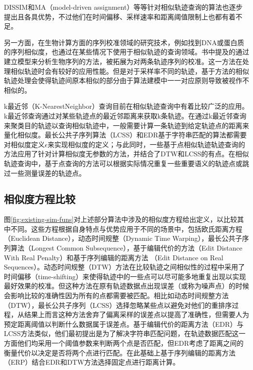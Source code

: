 DISSIM\cite{frentzos2007index}和MA（model-driven assignment）\cite{sankararaman2013model}等等针对相似轨迹查询的算法也逐步提出且各具优势，不过他们在时间偏移、采样速率和距离阈值限制上也都有着不足。

另一方面，在生物计算方面的序列校准领域的研究技术，例如找到DNA或蛋白质的序列相似度，也通过在某些情况下使用于相似轨迹的查询领域。书\cite{durbin1998biological}中提及的通过建立模型来分析生物序列的方法，被拓展为对两条轨迹序列的校准。这一方法在处理相似轨迹时会有较好的应用性能。但是对于采样率不同的轨迹，基于方法\cite{durbin1998biological}的相似轨迹处理会使得轨迹间原本相似的部分由于算法建模中一一对应原则导致被视作不相似的。

k最近邻（K-NearestNeighbor）查询目前在相似轨迹查询中有着比较广泛的应用。k最近邻查询通过对某些轨迹点的最近邻距离来获取k条轨迹。在通过k最近邻查询来聚类目的轨迹以查询相似轨迹中，一般需要计算一条轨迹到给定轨迹点的距离来量化相似度。最长公共子序列算法（LCSS）和EDR基于字符串匹配的算法都需要对相似度定义$\epsilon$来实现相似度的定义；与此同时，一些基于点相似轨迹轨迹查询的方法\cite{tang2011retrieving,chen2010searching}应用了针对计算相似度无参数的方法，并结合了DTW和LCSS的有点。在相似轨迹查询中，基于点查询的方法可以根据实际情况重复一些重要语义的轨迹点或跳过一些测量误差的轨迹点。




\subsection{相似度方程比较}
\label{subsec:situation-sim-fun-compare}


图\ref{fig:existing-sim-funs}对上述部分算法中涉及的相似度方程给出定义，以比较其中不同。这些方程根据自身特点与优势应用于不同的场景中\cite{morse2007efficient}，包括欧氏距离方程（Euclidean Distance），动态时间规整（Dynamic Time Warping），最长公共子序列算法（Longest Common Subsequence），基于编辑代价的方法（Edit Distance With Real Penalty）和基于序列编辑的距离方法 （Edit Distance on Real Sequences）。动态时间规整（DTW）方法在比较轨迹之间相似性的过程中采用了时间偏移（time-shifting）来使得轨迹中的一些点可以尽可能多地重复出现以实现最好效果的校准。但这种方法在原有轨迹数据点出现误差（或称为噪声点）的时候会影响比较的准确性因为所有的点都需要被匹配。相比如动态时间规整方法（DTW），最长公共子序列（LCSS）选择忽略某些点以避免对他们的重排序过程，从结果上而言这种方法舍弃了偏离采样的误差点以提高了准确性，但需要人为预定距离阈值以判断什么数据属于误差点。基于编辑代价的距离方法（EDR）与LCSS方法类似，他们最初提出是为了解决字符串匹配问题，在轨迹数据匹配这一方面他们均采用一个阈值参数来判断两个点是否匹配，但EDR考虑了距离之间的衡量代价以决定是否将两个点进行匹配。在此基础上基于序列编辑的距离方法（ERP）结合EDR和DTW方法选择固定点进行距离计算。

